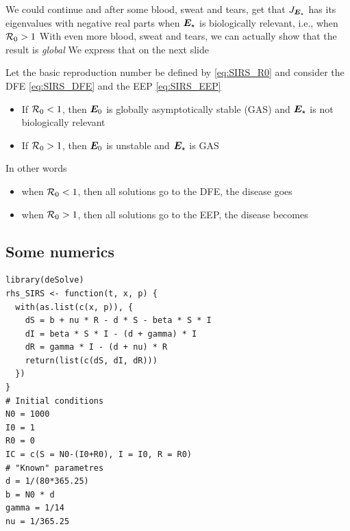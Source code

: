 \documentclass[aspectratio=169]{beamer}\usepackage[]{graphicx}\usepackage[]{xcolor}
\begin{document}
\begin{frame}
We could continue and after some blood, sweat and tears, get that $J_{\bm{E}_\star}$ has its eigenvalues with negative real parts when $\bm{E}_\star$ is biologically relevant, i.e., when $\mathcal{R}_0>1$
\vfill
With even more blood, sweat and tears, we can actually show that the result is \emph{global}
\vfill We express that on the next slide
\end{frame}

\begin{frame}
\begin{theorem}\label{th:SIRS_GAS_behaviour}
Let the basic reproduction number be defined by \eqref{eq:SIRS_R0} and consider the DFE \eqref{eq:SIRS_DFE} and the EEP \eqref{eq:SIRS_EEP}
\vskip1cm
\begin{itemize}
\item If $\mathcal{R}_0<1$, then $\bm{E}_0$ is globally asymptotically stable (GAS) and $\bm{E}_\star$ is not biologically relevant
\item If $\mathcal{R}_0>1$, then $\bm{E}_0$ is unstable and $\bm{E}_\star$ is GAS
\end{itemize}
\end{theorem}
\vfill
In other words
\begin{itemize}
\item when $\mathcal{R}_0<1$, then all solutions go to the DFE, the disease goes 
\item when $\mathcal{R}_0>1$, then all solutions go to the EEP, the disease becomes 
\end{itemize}
\end{frame}

\subsection{Some numerics}


\begin{frame}[fragile]
\begin{lstlisting}
library(deSolve)
rhs_SIRS <- function(t, x, p) {
  with(as.list(c(x, p)), {
    dS = b + nu * R - d * S - beta * S * I
    dI = beta * S * I - (d + gamma) * I
    dR = gamma * I - (d + nu) * R
    return(list(c(dS, dI, dR)))
  })
}
# Initial conditions
N0 = 1000
I0 = 1
R0 = 0
IC = c(S = N0-(I0+R0), I = I0, R = R0)
# "Known" parametres
d = 1/(80*365.25)
b = N0 * d
gamma = 1/14
nu = 1/365.25
\end{lstlisting}
\end{frame}
\end{document}
